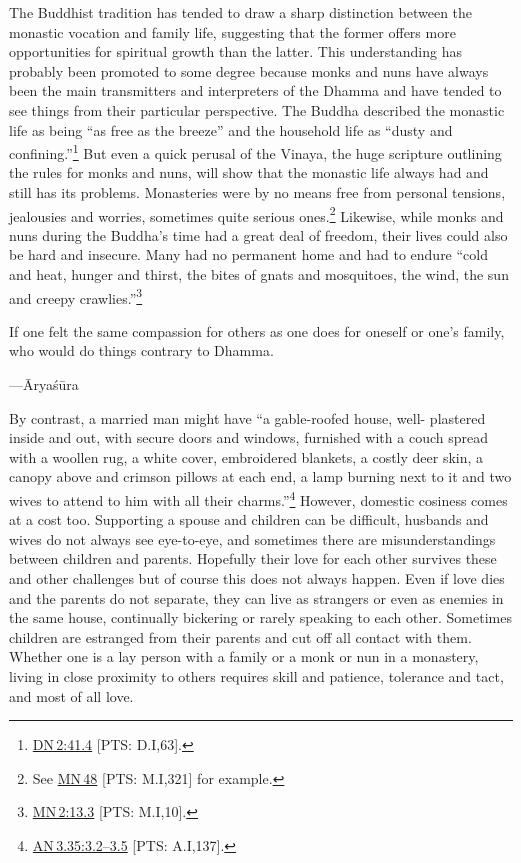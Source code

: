 \documentclass[10pt, openright]{book}
\newenvironment{epigram-2}%
{%
\setstretch{1.4}
\vspace{1em}
\noindent
\quoting[leftmargin=2cm,rightmargin=2cm]%
\begin{itshape}
\large
}%
{\end{itshape}\endquoting
}%
\newenvironment{epigram-2-cite}%
{%
\quoting[leftmargin=2cm,rightmargin=2cm]%
\noindent\normal\hspace*{\fill} 
}%
{\endquoting
}%
\begin{document}
The Buddhist tradition has tended to draw a sharp distinction between the monastic vocation and family life, suggesting that the former offers more opportunities for spiritual growth than the latter. This understanding has probably been promoted to some degree because monks and nuns have always been the main transmitters and interpreters of the Dhamma and have tended to see things from their particular perspective. The Buddha described the monastic life as being “as free as the breeze” and the household life as “dusty and confining.”\footnote {\href{https://suttacentral.net/dn2/en/sujato\#41.4}{DN 2:41.4} [PTS: D.I,63].} But even a quick perusal of the Vinaya, the huge scripture outlining the rules for monks and nuns, will show that the monastic life always had and still has its problems. Monasteries were by no means free from personal tensions, jealousies and worries, sometimes quite serious ones.\footnote {See \href{https://suttacentral.net/mn48/en/sujato}{MN 48} [PTS: M.I,321] for example.} Likewise, while monks and nuns during the Buddha’s time had a great deal of freedom, their lives could also be hard and insecure. Many had no permanent home and had to endure “cold and heat, hunger and thirst, the bites of gnats and mosquitoes, the wind, the sun and creepy crawlies.”\footnote {\href{https://suttacentral.net/mn2/en/sujato\#13.3}{MN 2:13.3} [PTS: M.I,10].}


\begin{epigram-2}
If one felt the same compassion for others as one does for oneself or one’s family, who would do things contrary to Dhamma.
\end{epigram-2}
\begin{epigram-2-cite}
—Āryaśūra
\end{epigram-2-cite}

By contrast, a married man might have “a gable-roofed house, well- plastered inside and out, with secure doors and windows, furnished with a couch spread with a woollen rug, a white cover, embroidered blankets, a costly deer skin, a canopy above and crimson pillows at each end, a lamp burning next to it and two wives to attend to him with all their charms.”\footnote {\href{https://suttacentral.net/an3.35/en/sujato\#3.2}{AN 3.35:3.2–3.5} [PTS: A.I,137].} However, domestic cosiness comes at a cost too. Supporting a spouse and children can be difficult, husbands and wives do not always see eye-to-eye, and sometimes there are misunderstandings between children and parents. Hopefully their love for each other survives these and other challenges but of course this does not always happen. Even if love dies and the parents do not separate, they can live as strangers or even as enemies in the same house, continually bickering or rarely speaking to each other. Sometimes children are estranged from their parents and cut off all contact with them. Whether one is a lay person with a family or a monk or nun in a monastery, living in close proximity to others requires skill and patience, tolerance and tact, and most of all love.
\end{document}
